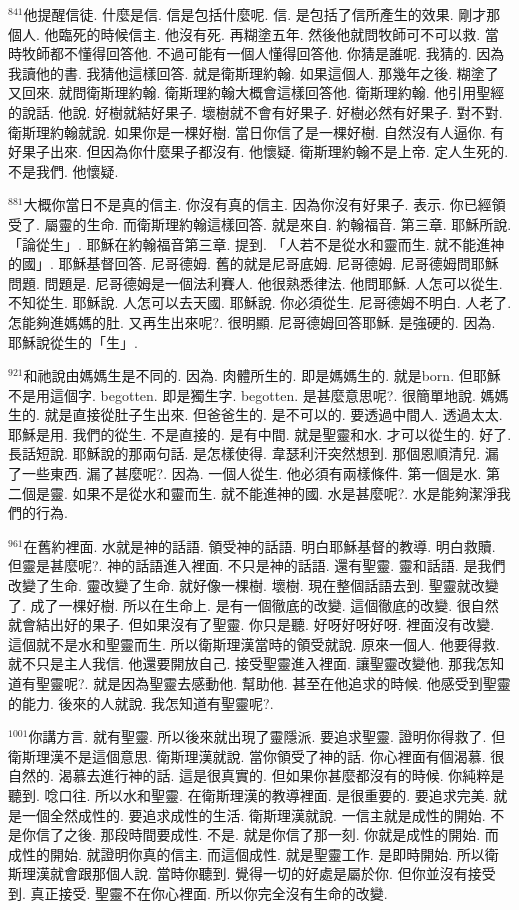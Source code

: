 \documentclass{book}
\begin{document}
$^{841}$他提醒信徒.
什麼是信.
信是包括什麼呢.
信.
是包括了信所產生的效果.
剛才那個人.
他臨死的時候信主.
他沒有死.
再糊塗五年.
然後他就問牧師可不可以救.
當時牧師都不懂得回答他.
不過可能有一個人懂得回答他.
你猜是誰呢.
我猜的.
因為我讀他的書.
我猜他這樣回答.
就是衛斯理約翰.
如果這個人.
那幾年之後.
糊塗了又回來.
就問衛斯理約翰.
衛斯理約翰大概會這樣回答他.
衛斯理約翰.
他引用聖經的說話.
他說.
好樹就結好果子.
壞樹就不會有好果子.
好樹必然有好果子.
對不對.
衛斯理約翰就說.
如果你是一棵好樹.
當日你信了是一棵好樹.
自然沒有人逼你.
有好果子出來.
但因為你什麼果子都沒有.
他懷疑.
衛斯理約翰不是上帝.
定人生死的.
不是我們.
他懷疑.

$^{881}$大概你當日不是真的信主.
你沒有真的信主.
因為你沒有好果子.
表示.
你已經領受了.
屬靈的生命.
而衛斯理約翰這樣回答.
就是來自.
約翰福音.
第三章.
耶穌所說.
「論從生」.
耶穌在約翰福音第三章.
提到.
「人若不是從水和靈而生.
就不能進神的國」.
耶穌基督回答.
尼哥德姆.
舊的就是尼哥底姆.
尼哥德姆.
尼哥德姆問耶穌問題.
問題是.
尼哥德姆是一個法利賽人.
他很熟悉律法.
他問耶穌.
人怎可以從生.
不知從生.
耶穌說.
人怎可以去天國.
耶穌說.
你必須從生.
尼哥德姆不明白.
人老了.
怎能夠進媽媽的肚.
又再生出來呢?.
很明顯.
尼哥德姆回答耶穌.
是強硬的.
因為.
耶穌說從生的「生」.

$^{921}$和祂說由媽媽生是不同的.
因為.
肉體所生的.
即是媽媽生的.
就是born.
但耶穌不是用這個字.
begotten.
即是獨生字.
begotten.
是甚麼意思呢?.
很簡單地說.
媽媽生的.
就是直接從肚子生出來.
但爸爸生的.
是不可以的.
要透過中間人.
透過太太.
耶穌是用.
我們的從生.
不是直接的.
是有中間.
就是聖靈和水.
才可以從生的.
好了.
長話短說.
耶穌說的那兩句話.
是怎樣使得.
韋瑟利汗突然想到.
那個恩順清兒.
漏了一些東西.
漏了甚麼呢?.
因為.
一個人從生.
他必須有兩樣條件.
第一個是水.
第二個是靈.
如果不是從水和靈而生.
就不能進神的國.
水是甚麼呢?.
水是能夠潔淨我們的行為.

$^{961}$在舊約裡面.
水就是神的話語.
領受神的話語.
明白耶穌基督的教導.
明白救贖.
但靈是甚麼呢?.
神的話語進入裡面.
不只是神的話語.
還有聖靈.
靈和話語.
是我們改變了生命.
靈改變了生命.
就好像一棵樹.
壞樹.
現在整個話語去到.
聖靈就改變了.
成了一棵好樹.
所以在生命上.
是有一個徹底的改變.
這個徹底的改變.
很自然就會結出好的果子.
但如果沒有了聖靈.
你只是聽.
好呀好呀好呀.
裡面沒有改變.
這個就不是水和聖靈而生.
所以衛斯理漢當時的領受就說.
原來一個人.
他要得救.
就不只是主人我信.
他還要開放自己.
接受聖靈進入裡面.
讓聖靈改變他.
那我怎知道有聖靈呢?.
就是因為聖靈去感動他.
幫助他.
甚至在他追求的時候.
他感受到聖靈的能力.
後來的人就說.
我怎知道有聖靈呢?.

$^{1001}$你講方言.
就有聖靈.
所以後來就出現了靈隱派.
要追求聖靈.
證明你得救了.
但衛斯理漢不是這個意思.
衛斯理漢就說.
當你領受了神的話.
你心裡面有個渴慕.
很自然的.
渴慕去進行神的話.
這是很真實的.
但如果你甚麼都沒有的時候.
你純粹是聽到.
唸口往.
所以水和聖靈.
在衛斯理漢的教導裡面.
是很重要的.
要追求完美.
就是一個全然成性的.
要追求成性的生活.
衛斯理漢就說.
一信主就是成性的開始.
不是你信了之後.
那段時間要成性.
不是.
就是你信了那一刻.
你就是成性的開始.
而成性的開始.
就證明你真的信主.
而這個成性.
就是聖靈工作.
是即時開始.
所以衛斯理漢就會跟那個人說.
當時你聽到.
覺得一切的好處是屬於你.
但你並沒有接受到.
真正接受.
聖靈不在你心裡面.
所以你完全沒有生命的改變.
\end{document}
